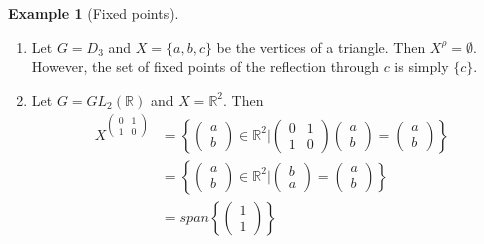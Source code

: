 \documentclass[12pt]{article}
\theoremstyle{definition}
\newcommand{\R}{\mathbb{R}}
\newtheorem{example}{\color{WildStrawberry}Example}
\theoremstyle{definition}
\begin{document}
\begin{example}[Fixed points]
\begin{enumerate}
	\item Let $G = D_3$ and $X = \{a,b,c\}$ be the vertices of a triangle. Then $X^\rho = \emptyset$. However, the set of fixed points of the reflection through $c$ is simply $\{c\}$. 
	\item Let $G = GL_2(\R)$ and $X = \R^2$. Then
	\begin{align*}
	X^{\begin{pmatrix}
	0 & 1 \\
	1 & 0
	\end{pmatrix}}
	&= \left\{ \begin{pmatrix} a \\ b \end{pmatrix}\in \R^2 \vert \begin{pmatrix}
	0 & 1 \\
	1 & 0
	\end{pmatrix} \begin{pmatrix} a \\ b \end{pmatrix} = \begin{pmatrix} a \\ b \end{pmatrix}\right\} \\
	&=  \left\{ \begin{pmatrix} a \\ b \end{pmatrix}\in \R^2 \vert \begin{pmatrix}b \\ a \end{pmatrix} = \begin{pmatrix} a \\ b \end{pmatrix}\right\} \tag{where the first and second coord are the same}\\
	&= span\left\{ \begin{pmatrix}
	1 \\ 1
	\end{pmatrix} \right\} 
	\end{align*}
\end{enumerate}
\end{example}
\end{document}
